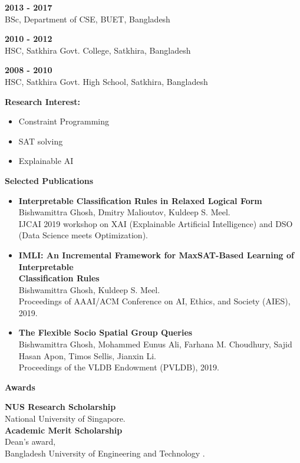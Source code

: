 \documentclass[a4paper,11pt,final]{article}
\newcommand{\CVSection}[1]
{\Large\textbf{#1}\par
	\SmallSep\normalsize\normalfont}
\newcommand{\CVItem}[1]
{\textbf{\color{Black} #1}}
\newcommand{\Sep}{\vspace{1.5em}}
\newcommand{\SmallSep}{\vspace{0.5em}}
\begin{document}
\CVItem{ 2013  -  2017 }\\
BSc, Department of CSE, BUET, Bangladesh
\SmallSep

\CVItem{ 2010  -  2012 }\\
HSC, Satkhira Govt. College, Satkhira, Bangladesh 
\SmallSep

\CVItem{ 2008  -  2010 }\\
HSC, Satkhira Govt. High School, Satkhira, Bangladesh


\Sep
\CVSection{Research Interest:}
\begin{itemize}
	\item Constraint Programming
	\item SAT solving
	\item Explainable AI
\end{itemize}


\Sep
\CVSection{Selected Publications}
\begin{itemize}
	\item \CVItem{Interpretable Classification Rules in Relaxed Logical Form}\\
	Bishwamittra Ghosh, Dmitry Malioutov, Kuldeep S. Meel.\\
	IJCAI 2019 workshop on XAI (Explainable Artificial Intelligence) and DSO (Data Science meets Optimization).
	\item \CVItem{IMLI: An Incremental Framework for MaxSAT-Based Learning of Interpretable \\ Classification Rules}\\
	Bishwamittra Ghosh, Kuldeep S. Meel.\\
	Proceedings of AAAI/ACM Conference on AI, Ethics, and Society (AIES), 2019.
	\item \CVItem{The Flexible Socio Spatial Group Queries}\\
	Bishwamittra Ghosh, Mohammed Eunus Ali, Farhana M. Choudhury,
	Sajid Hasan Apon, Timos Sellis, Jianxin Li.\\
	Proceedings of the VLDB Endowment (PVLDB), 2019.
\end{itemize}





\newpage
\CVSection{Awards}
\CVItem{NUS Research Scholarship}\\
National University of Singapore.\\


\CVItem{Academic Merit Scholarship }
\\Dean's award,\\
Bangladesh University of Engineering and Technology .\\
\end{document}
